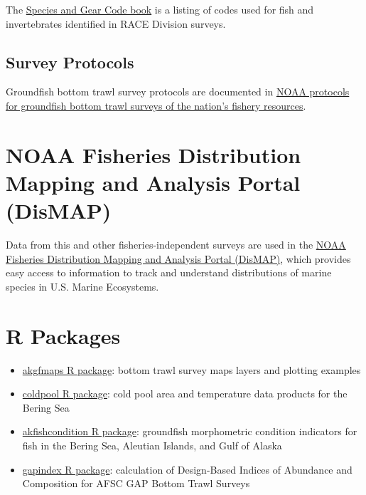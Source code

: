 \documentclass[
  letterpaper,
  oneside,
  open=any]{scrbook}
\providecommand{\tightlist}{%
  \setlength{\itemsep}{0pt}\setlength{\parskip}{0pt}}\usepackage{longtable,booktabs,array}
\begin{document}
The
\href{https://www.fisheries.noaa.gov/resource/document/groundfish-survey-species-code-manual-and-data-codes-manual}{Species
and Gear Code book} is a listing of codes used for fish and
invertebrates identified in RACE Division surveys.

\hypertarget{survey-protocols}{%
\subsection*{Survey Protocols}\label{survey-protocols}}

Groundfish bottom trawl survey protocols are documented in
\href{https://repository.library.noaa.gov/view/noaa/12855}{NOAA
protocols for groundfish bottom trawl surveys of the nation's fishery
resources}.

\hypertarget{noaa-fisheries-distribution-mapping-and-analysis-portal-dismap}{%
\section*{NOAA Fisheries Distribution Mapping and Analysis Portal
(DisMAP)}\label{noaa-fisheries-distribution-mapping-and-analysis-portal-dismap}}


Data from this and other fisheries-independent surveys are used in the
\href{https://apps-st.fisheries.noaa.gov/dismap/}{NOAA Fisheries
Distribution Mapping and Analysis Portal (DisMAP)}, which provides easy
access to information to track and understand distributions of marine
species in U.S. Marine Ecosystems.

\hypertarget{r-packages}{%
\section*{R Packages}\label{r-packages}}


\begin{itemize}
\tightlist
\item
  \href{https://github.com/afsc-gap-products/akgfmaps}{akgfmaps R
  package}: bottom trawl survey maps layers and plotting examples
\item
  \href{https://github.com/afsc-gap-products/coldpool}{coldpool R
  package}: cold pool area and temperature data products for the Bering
  Sea
\item
  \href{https://github.com/afsc-gap-products/akfishcondition}{akfishcondition
  R package}: groundfish morphometric condition indicators for fish in
  the Bering Sea, Aleutian Islands, and Gulf of Alaska
\item
  \href{https://github.com/afsc-gap-products/gapindex}{gapindex R
  package}: calculation of Design-Based Indices of Abundance and
  Composition for AFSC GAP Bottom Trawl Surveys
\end{itemize}
\end{document}
